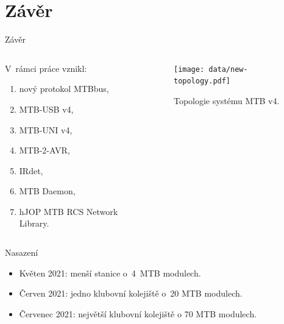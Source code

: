 \documentclass[aspectratio=169]{beamer}
\begin{document}

\section{Závěr}

\begin{frame}{Závěr}
\begin{columns}
	\begin{column}{.5\textwidth}
		V rámci práce vznikl:
		\begin{enumerate}
		\item nový protokol MTBbus,
		\item MTB-USB v4,
		\item MTB-UNI v4,
		\item MTB-2-AVR,
		\item IRdet,
		\item MTB Daemon,
		\item hJOP MTB RCS Network Library.
		\end{enumerate}
	\end{column}
	\begin{column}{.5\textwidth}
		\begin{figure}
		\texttt{[image: data/new-topology.pdf]}
		\caption{Topologie systému MTB v4.}
		\end{figure}
	\end{column}
\end{columns}
\end{frame}


\begin{frame}{Nasazení}
\begin{itemize}
\item Květen 2021: menší stanice o 4 MTB modulech.
\item Červen 2021: jedno klubovní kolejiště o 20 MTB modulech.
\item Červenec 2021: největší klubovní kolejiště o 70 MTB modulech.
\end{itemize}
\end{frame}

\end{document}

